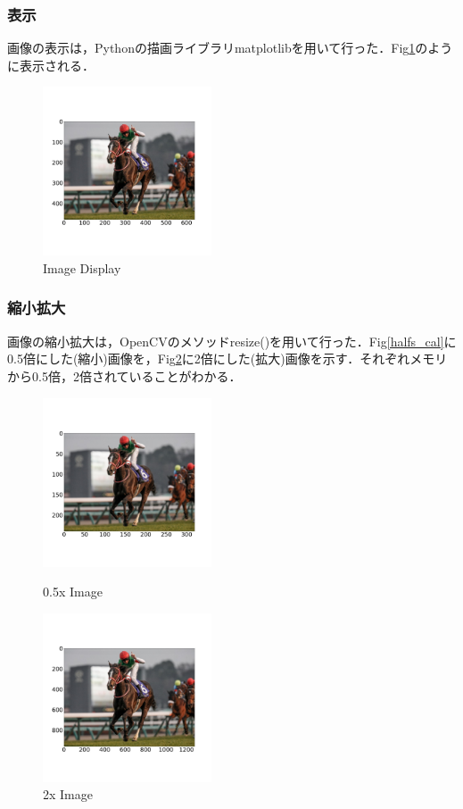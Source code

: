 \documentclass[11pt,a4j]{jarticle}
\begin{document}
\subsubsection{表示}
画像の表示は，Pythonの描画ライブラリmatplotlibを用いて行った．Fig\ref{img}のように表示される．
\begin{figure}[ht]
	\centering
	\includegraphics[width=5cm]{../1_BasicImageProcessing/output/img.jpg}
	\vspace{-1cm}
	\renewcommand{\figurename}{Fig}
	\caption{Image Display}
	\label{img}
\end{figure}

\subsubsection{縮小拡大}
画像の縮小拡大は，OpenCVのメソッドresize()を用いて行った．Fig\ref{halfs_cal}に0.5倍にした(縮小)画像を，Fig\ref{double_scal}に2倍にした(拡大)画像を示す．それぞれメモリから0.5倍，2倍されていることがわかる．
\begin{figure}[t]
	\begin{minipage}{0.5\hsize}
		\centering
		\includegraphics[width=5cm]{../1_BasicImageProcessing/output/half_scal.jpg}
		\vspace{-1cm}
		\renewcommand{\figurename}{Fig}
		\caption{0.5x Image}
		\label{halfs_cal}
	\end{minipage}
	\begin{minipage}{0.5\hsize}
		\centering
		\includegraphics[width=5cm]{../1_BasicImageProcessing/output/double_scal.jpg}
		\vspace{-1cm}
		\renewcommand{\figurename}{Fig}
		\caption{2x Image}
		\label{double_scal}
	\end{minipage}
\end{figure}
\end{document}
